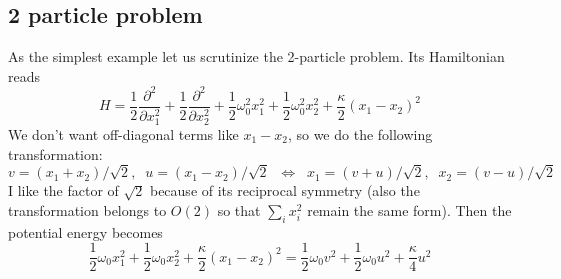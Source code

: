 \documentclass[letterpaper,prb,superscriptaddress]{revtex4}
\theoremstyle{definition}
\begin{document}
\subsection{2 particle problem}
As the simplest example let us scrutinize the 2-particle problem. Its Hamiltonian reads
\begin{equation}
	H = \frac{1}{2} \frac{\partial^2 }{\partial x_1^2} + \frac{1}{2} \frac{\partial ^2}{\partial x_2^2} + \frac{1}{2}\omega_0^2 x_1^2 + \frac{1}{2} \omega_0^2 x_2^2 + \frac{\kappa}{2}(x_1 - x_2)^2
\end{equation}
We don't want off-diagonal terms like $x_1 - x_2$, so we do the following transformation:
\begin{equation}
	v = (x_1 + x_2)/\sqrt{2},\;\;u = (x_1 - x_2)/\sqrt{2}\;\;\iff\;\; x_1 =  (v + u)/\sqrt{2},\;\; x_2 = (v - u)/\sqrt{2}
\end{equation}
I like the factor of $\sqrt{2}$ because of its reciprocal symmetry (also the transformation belongs to $O(2)$ so that $\sum_{i} x_i^2$ remain the same form). Then the potential energy becomes
\begin{equation}
	\frac{1}{2} \omega_0 x_1^2 + \frac{1}{2}\omega_0 x_2^2 + \frac{\kappa}{2} (x_1 - x_2)^2 = \frac{1}{2}\omega_0 v^2 + \frac{1}{2} \omega_0 u^2 + \frac{\kappa}{4} u^2
\end{equation}
\end{document}
